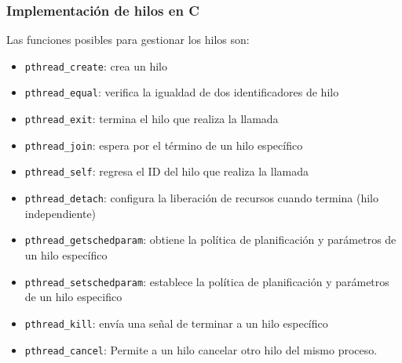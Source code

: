 \subsubsection{Implementación de hilos en C}

Las funciones posibles para gestionar los hilos son:

\begin{itemize}
	\item   \texttt{pthread\_create}: crea un hilo
	\item   \texttt{pthread\_equal}: verifica la igualdad de dos identificadores de hilo
	\item   \texttt{pthread\_exit}: termina el hilo que realiza la llamada
	\item   \texttt{pthread\_join}: espera por el término de un hilo específico
	\item   \texttt{pthread\_self}: regresa el ID del hilo que realiza la llamada
	\item   \texttt{pthread\_detach}: configura la liberación de recursos cuando termina (hilo independiente)
	\item   \texttt{pthread\_getschedparam}: obtiene la política de planificación y parámetros de un hilo específico
	\item   \texttt{pthread\_setschedparam}: establece la política de planificación y parámetros de un hilo especifico
	\item   \texttt{pthread\_kill}: envía una señal de terminar a un hilo específico
	\item   \texttt{pthread\_cancel}: Permite a un hilo cancelar otro hilo del mismo proceso.
\end{itemize}
